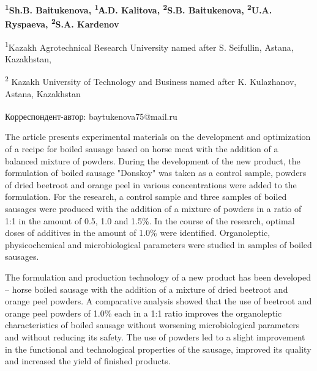 
\begin{articleheader}

{\bfseries
\textsuperscript{1}Sh.B. Baitukenova\textsuperscript{\envelope },
\textsuperscript{1}А.D. Kalitova,
\textsuperscript{2}S.B. Baitukenova,
\textsuperscript{2}U.A. Ryspaeva,
\textsuperscript{2}S.A. Kardenov
}
\end{articleheader}

\begin{affiliation}
\textsuperscript{1}Kazakh Agrotechnical Research University named after S. Seifullin, Astana, Kazakhstan,

\textsuperscript{2} Kazakh University of Technology and Business named after K. Kulazhanov, Astana, Kazakhstan

\raggedright \textsuperscript{\envelope }Корреспондент-автор: baytukenova75@mail.ru
\end{affiliation}

The article presents experimental materials on the development and
optimization of a recipe for boiled sausage based on horse meat with the
addition of a balanced mixture of powders. During the development of the
new product, the formulation of boiled sausage "Donskoy" was taken as a
control sample, powders of dried beetroot and orange peel in various
concentrations were added to the formulation. For the research, a
control sample and three samples of boiled sausages were produced with
the addition of a mixture of powders in a ratio of 1:1 in the amount of
0.5, 1.0 and 1.5\%. In the course of the research, optimal doses of
additives in the amount of 1.0\% were identified. Organoleptic,
physicochemical and microbiological parameters were studied in samples
of boiled sausages.

The formulation and production technology of a new product has been
developed -- horse boiled sausage with the addition of a mixture of
dried beetroot and orange peel powders. A comparative analysis showed
that the use of beetroot and orange peel powders of 1.0\% each in a 1:1
ratio improves the organoleptic characteristics of boiled sausage
without worsening microbiological parameters and without reducing its
safety. The use of powders led to a slight improvement in the functional
and technological properties of the sausage, improved its quality and
increased the yield of finished products.

